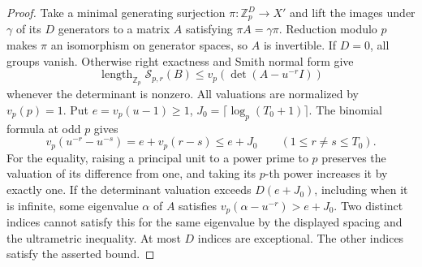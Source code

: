 \documentclass[a4paper,11pt]{article}
\theoremstyle{definition}
\theoremstyle{remark}
\newcommand{\ZZ}{\mathbb Z}\newcommand{\ord}{\operatorname{ord}}
\newcommand{\len}{\operatorname{length}}\newcommand{\Res}{\operatorname*{Res}}
\numberwithin{equation}{section}
\newcommand{\Sel}{\mathcal S}
\begin{document}
\begin{proof}
Take a minimal generating surjection \(\pi:\ZZ_p^D\to X'\) and lift the images under \(\gamma\) of its \(D\) generators to a matrix \(A\) satisfying \(\pi A=\gamma\pi\). Reduction modulo \(p\) makes \(\pi\) an isomorphism on generator spaces, so \(A\) is invertible. If \(D=0\), all groups vanish. Otherwise right exactness and Smith normal form give
\[
 \len_{\ZZ_p}\Sel_{p,r}(B)\le v_p(\det(A-u^{-r}I))
\]
whenever the determinant is nonzero. All valuations are normalized by \(v_p(p)=1\). Put \(e=v_p(u-1)\ge1\), \(J_0=\lceil\log_p(T_0+1)\rceil\). The binomial formula at odd \(p\) gives
\[
 v_p(u^{-r}-u^{-s})=e+v_p(r-s)\le e+J_0\qquad(1\le r\ne s\le T_0).
\]
For the equality, raising a principal unit to a power prime to \(p\) preserves the valuation of its difference from one, and taking its \(p\)-th power increases it by exactly one. If the determinant valuation exceeds \(D(e+J_0)\), including when it is infinite, some eigenvalue \(\alpha\) of \(A\) satisfies \(v_p(\alpha-u^{-r})>e+J_0\). Two distinct indices cannot satisfy this for the same eigenvalue by the displayed spacing and the ultrametric inequality. At most \(D\) indices are exceptional. The other indices satisfy the asserted bound.
\end{proof}
\end{document}
